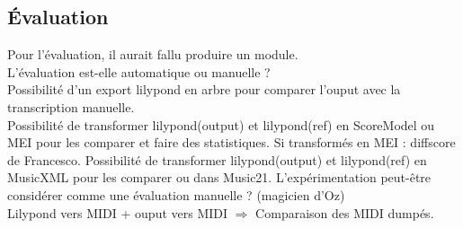 \subsection*{Évaluation}
Pour l’évaluation, il aurait fallu produire un module.\\
L’évaluation est-elle automatique ou manuelle ?\\
Possibilité d’un export lilypond en arbre pour comparer l’ouput avec la transcription manuelle.\\
Possibilité de transformer lilypond(output) et lilypond(ref) en ScoreModel ou MEI pour les comparer et faire des statistiques. Si transformés en MEI : diffscore de Francesco.
Possibilité de transformer lilypond(output) et lilypond(ref) en MusicXML pour les comparer ou dans Music21.
L’expérimentation peut-être considérer comme une évaluation manuelle ? (magicien d’Oz)\\
Lilypond vers MIDI + ouput vers MIDI $\Rightarrow$ Comparaison des MIDI dumpés.\\
